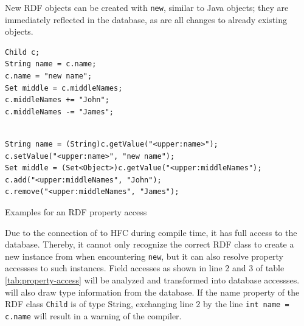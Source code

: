 New RDF objects can be created with \texttt{new}, similar to Java objects; they
are immediately reflected in the database, as are all changes to already
existing objects.


\begin{table}[htbp]
  \centering
\begin{small}
\begin{minipage}[t]{0.35\textwidth}
\begin{verbatim}
Child c;
String name = c.name;
c.name = "new name";
Set middle = c.middleNames;
c.middleNames += "John";
c.middleNames -= "James";
\end{verbatim}
\end{minipage}
\begin{minipage}[t]{0.6\textwidth}
\begin{verbatim}

String name = (String)c.getValue("<upper:name>");
c.setValue("<upper:name>", "new name");
Set middle = (Set<Object>)c.getValue("<upper:middleNames");
c.add("<upper:middleNames", "John");
c.remove("<upper:middleNames", "James");
\end{verbatim}
\end{minipage}
\end{small}
  \caption{Examples for an RDF property access}
  \label{tab:property-access}
\end{table}

%
Due to the connection of \vonda to HFC during compile time, it has full access to the database. Thereby, it cannot only recognize the correct RDF class to create a new instance from when encountering \texttt{new}, but it can also resolve property accessses to such instances. Field accesses as shown in line 2 and 3 of table \ref{tab:property-access} will be analyzed and transformed into database accessses. \vonda will also draw type information from the database. If the name property of the RDF class \texttt{Child} is of type String, exchanging line 2 by the line \texttt{int name = c.name} will result in a warning of the compiler.


